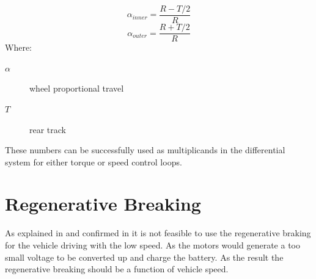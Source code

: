 \begin{equation}\label{diff_eq}
    \alpha_{inner} = \frac{R - T/2}{R}
\end{equation}
\begin{equation}
    \alpha_{outer} = \frac{R + T/2}{R} 
\end{equation}
Where:
\begin{description}
    \item[$\alpha$] wheel proportional travel
    \item[$T$] rear track
\end{description}




These numbers can be successfully used as multiplicands in the differential system for either torque or speed control loops.

\section{Regenerative Breaking} \label{regenerative_theory_section}

As explained in \cite{low_speed_regenerative_breaking} and confirmed in \cite{regen_strategy} it is not feasible to use the regenerative braking for the vehicle driving with the low speed. As the motors would generate a too small voltage to be converted up and charge the battery.
As the result the regenerative breaking should be a function of vehicle speed.


